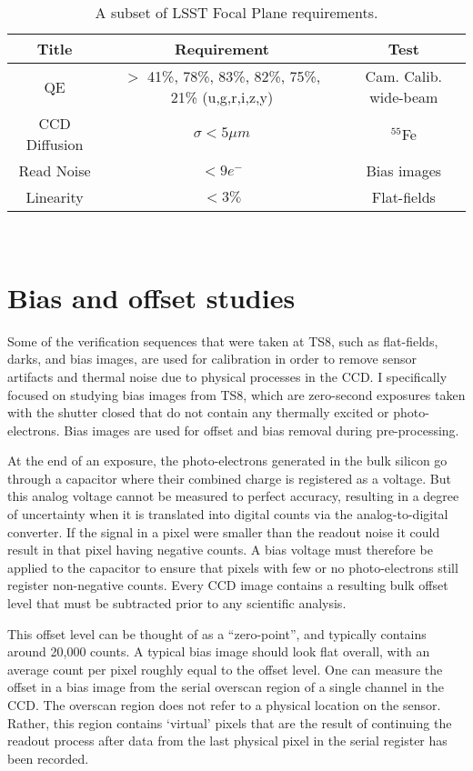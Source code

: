 \begin{table}
\caption{A subset of LSST Focal Plane requirements.}
\label{tab:cam-req}
\centering
\begin{tabular}{|c|c|c|}
  \hline
  Title & Requirement & Test \\
  \hline \hline
  QE & $>$ 41\%, 78\%, 83\%, 82\%, 75\%, 21\% (u,g,r,i,z,y) & Cam. Calib. wide-beam \\
  \hline
  CCD Diffusion & $\sigma < 5\mu m$ & $^{55}$Fe \\
  \hline
  Read Noise & $< 9e^{-}$ & Bias images \\
  \hline
  Linearity & $<3\%$ & Flat-fields\\
  \hline
\end{tabular}
\end{table}\\ 

\section{Bias and offset studies}

Some of the verification sequences that were taken at TS8, such as flat-fields, darks, and bias images, are used for calibration in order to remove sensor artifacts and thermal noise due to physical processes in the CCD. I specifically focused on studying bias images from TS8, which are zero-second exposures taken with the shutter closed that do not contain any thermally excited or photo-electrons. Bias images are used for offset and bias removal during pre-processing. 

At the end of an exposure, the photo-electrons generated in the bulk silicon go through a capacitor where their combined charge is registered as a voltage. But this analog voltage cannot be measured to perfect accuracy, resulting in a degree of uncertainty when it is translated into digital counts via the analog-to-digital converter. If the signal in a pixel were smaller than the readout noise it could result in that pixel having negative counts. A bias voltage must therefore be applied to the capacitor to ensure that pixels with few or no photo-electrons still register non-negative counts. Every CCD image contains a resulting bulk offset level that must be subtracted prior to any scientific analysis. 

This offset level can be thought of as a ``zero-point'', and typically contains around 20,000 counts. A typical bias image should look flat overall, with an average count per pixel roughly equal to the offset level. One can measure the offset in a bias image from the serial overscan region of a single channel in the CCD. The overscan region does not refer to a physical location on the sensor. Rather, this region contains ‘virtual’ pixels that are the result of continuing the readout process after data from the last physical pixel in the serial register has been recorded. 

